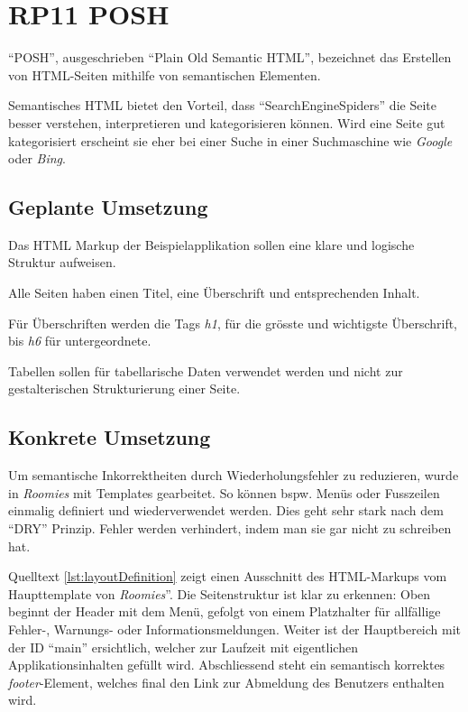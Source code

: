 \section{RP11 POSH}
\label{sec:principle-rp11-posh}

``POSH'', ausgeschrieben ``Plain Old Semantic HTML'', bezeichnet das Erstellen von HTML-Seiten mithilfe von semantischen Elementen. \cite{SemanticHTML}

Semantisches HTML bietet den Vorteil, dass ``\glspl{SearchEngineSpider}'' die Seite besser verstehen, interpretieren und kategorisieren können. Wird eine Seite gut kategorisiert erscheint sie eher bei einer Suche in einer Suchmaschine wie \emph{Google} oder \emph{Bing}.

\subsection*{Geplante Umsetzung}
Das HTML Markup der Beispielapplikation sollen eine klare und logische Struktur aufweisen.

Alle Seiten haben einen Titel, eine Überschrift und entsprechenden Inhalt.

Für Überschriften werden die Tags \emph{h1}, für die grösste und wichtigste Überschrift, bis \emph{h6} für untergeordnete.

Tabellen sollen für tabellarische Daten verwendet werden und nicht zur gestalterischen Strukturierung einer Seite.


\subsection*{Konkrete Umsetzung}
Um semantische Inkorrektheiten durch Wiederholungsfehler zu reduzieren, wurde in \emph{Roomies} mit Templates gearbeitet. So können bspw. Menüs oder Fusszeilen einmalig definiert und wiederverwendet werden. Dies geht sehr stark nach dem ``\gls{DRY}'' Prinzip. Fehler werden verhindert, indem man sie gar nicht zu schreiben hat.

Quelltext \ref{lst:layoutDefinition} zeigt einen Ausschnitt des HTML-Markups vom Haupttemplate von \emph{Roomies}''. Die Seitenstruktur ist klar zu erkennen: Oben beginnt der Header mit dem Menü, gefolgt von einem Platzhalter für allfällige Fehler-, Warnungs- oder Informationsmeldungen. Weiter ist der Hauptbereich mit der ID ``main'' ersichtlich, welcher zur Laufzeit mit eigentlichen Applikationsinhalten gefüllt wird. Abschliessend steht ein semantisch korrektes \emph{footer}-Element, welches final den Link zur Abmeldung des Benutzers enthalten wird.

